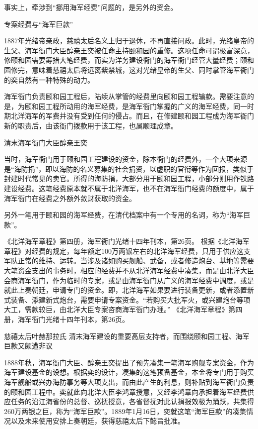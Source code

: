 \documentclass[12pt,UTF8]{ctexbook}
\begin{document}
事实上，牵涉到“挪用海军经费”问题的，是另外的资金。

专案经费与“海军巨款”

1887年光绪帝亲政，慈禧太后名义上归于退休，不再直接问政。此时，光绪皇帝的生父、海军衙门大臣醇亲王奕被任命主持颐和园的重修。这项任命可谓极富深意，修颐和园需要筹措大笔经费，而实为洋务建设衙门的海军衙门经管大量经费；颐和园修完，意味着慈禧太后将远离紫禁城，这对光绪皇帝的生父、同时掌管海军衙门的奕自然有一种特殊的动力。

海军衙门负责颐和园工程后，陆续从掌管的经费里向颐和园工程输款。需要注意的是，为颐和园工程所动用的海军经费，是海军衙门掌握的广义的海军经费，同一时期北洋海军的军费并没有受到任何的侵占。而且，在修建颐和园工程成为海军衙门新的职责后，由该衙门拨款用于该工程，也属顺理成章。


清末海军衙门大臣醇亲王奕

当时，海军衙门用于颐和园工程建设的资金，除本衙门的经费外，一个大项来源是“海防捐”，即以海防的名义募集的社会捐资，以虚职的官衔等作为回报，类似于封建时代常见的卖官。所得的海防捐，大部分用于颐和园工程，小部分则用作铁路建设经费。这笔经费原本就不属于北洋海军，也不在海军衙门经费的额度中，属于海军衙门在经费之外额外敛财获取的资金。

另外一笔用于颐和园的海军经费，在清代档案中有一个专用的名词，称为“海军巨款”。

《北洋海军章程》第四册，海军衙门光绪十四年刊本，第26页。
根据《北洋海军章程》对经费的规定，每年额定100万两银左右的北洋海军经费，只用于供应这支军队正常的维持、运转。当涉及诸如购买舰船、武备，或者修造炮台、基地等需要大笔资金支出的事务时，相应的经费并不从北洋海军经费中凑集，而是由北洋大臣会商海军衙门，作为临时的专案，或是由海军衙门从广义的海军经费中调度，或是就此上奏朝廷，申请专门的资金。即，北洋海军如果要进行装备更新，或者添置新式装备、添建新式炮台，需要申请专案资金。“若购买大批军火，或兴建炮台等项大工，需款较巨，由北洋大臣专案咨商海军衙门办理。” 《北洋海军章程》第四册，海军衙门光绪十四年刊本，第26页。


慈禧太后叶赫那拉氏 清末海军建设的重要高层支持者，而围绕颐和园工程、海军巨款又颇遭非议

1888年秋，海军衙门大臣、醇亲王奕提出了预先凑集一笔海军购舰专案资金，作为海军建设基金的设想。根据奕的设计，凑集的这笔预备基金，本金将专门用于购买海军舰船或兴办海防事务等大项支出，而由此产生的利息，则补贴到海军衙门负责的颐和园工程中。奕就此向北洋大臣李鸿章授意，又经李鸿章向承担着海军经费供应任务的沿江海省份的总督、巡抚授意，各省督抚对此认捐报效极为踊跃，共集得260万两银之巨，称为“海军巨款”。1889年1月16日，奕就这笔“海军巨款”的凑集情况以及未来使用安排上奏朝廷，获得慈禧太后下懿旨批准。
\end{document}
